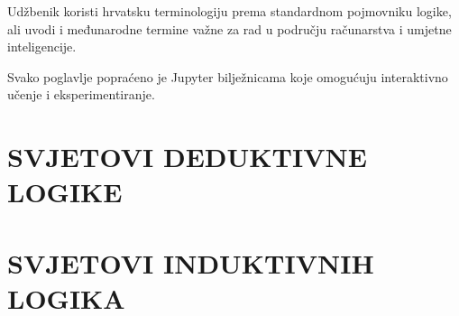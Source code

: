 \documentclass[11pt,a4paper,twoside,openright]{book}
\theoremstyle{definition}
\theoremstyle{plain}
\theoremstyle{remark}
\begin{document}
Udžbenik koristi hrvatsku terminologiju prema standardnom pojmovniku logike, ali uvodi i međunarodne termine važne za rad u području računarstva i umjetne inteligencije.

Svako poglavlje popraćeno je Jupyter bilježnicama koje omogućuju interaktivno učenje i eksperimentiranje.

\mainmatter



\part{SVJETOVI DEDUKTIVNE LOGIKE}






\part{SVJETOVI INDUKTIVNIH LOGIKA}





\appendix




\backmatter

% 
% 
\end{document}
